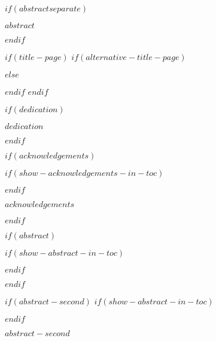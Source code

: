 \documentclass[a4paper, $if(page-layout)$$page-layout$$else$nobind$endif$]{templates/ociamthesis}
\begin{document}
$if(abstractseparate)$
\begin{abstractseparate}
  $abstract$
\end{abstractseparate}
$endif$

\begin{romanpages}

$if(title-page)$
$if(alternative-title-page)$

$else$
\maketitle
$endif$
$endif$

$if(dedication)$
\begin{dedication}
  $dedication$
\end{dedication}
$endif$

$if(acknowledgements)$

$if(show-acknowledgements-in-toc)$
{}
\renewcommand{\numberstyleacks}{plain}
\renewcommand{\numberstyleabstract}{plain}
$endif$

\begin{acknowledgements}
 	$acknowledgements$
\end{acknowledgements}

$endif$


$if(abstract)$

$if(show-abstract-in-toc)$
{}
\renewcommand{\numberstyleabstract}{plain}
$endif$

\renewcommand{\abstracttitle}{$if(abstract-heading)$$abstract-heading$$else$Abstract$endif$}
\begin{abstract}
	$abstract$
\end{abstract}

$endif$

$if(abstract-second)$
$if(show-abstract-in-toc)$
\renewcommand{\numberstyleabstract}{plain}
$endif$

\renewcommand{\abstractsecondtitle}{$abstract-second-heading$}
\begin{abstractsecond}
	$abstract-second$
\end{abstractsecond}


\end{romanpages}
\end{document}
